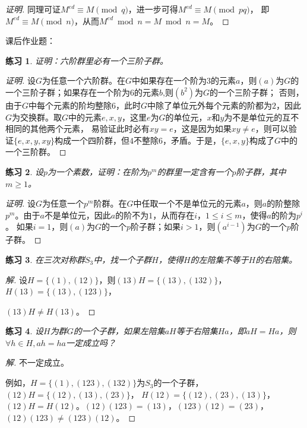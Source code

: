 \documentclass{article}
\newtheorem{Exercise}{练习}
\begin{document}
\begin{CJK*}{UTF8}{gbsn}
\begin{proof}[证明]
同理可证$M^{ed}\equiv M \pmod q$，进一步可得$M^{ed}\equiv M \pmod{pq}$，
即$M^{ed}\equiv M \pmod n$，从而$M^{ed} \bmod n = M\bmod n=M$。
\end{proof}

课后作业题：
\begin{Exercise}
证明：六阶群里必有一个三阶子群。
\end{Exercise}
\begin{proof}[证明]
  设$G$为任意一个六阶群。在$G$中如果存在一个阶为$3$的元素$a$，则$(a)$为$G$的一个三阶子群；如果存在一个阶为$6$的元素$b$,则$(b^2)$为$G$的一个三阶子群；
否则，由于$G$中每个元素的阶均整除$6$，此时$G$中除了单位元外每个元素的阶都为$2$，因此$G$为交换群。取$G$中的元素$e,x,y$，这里$e$为$G$的单位元，$x$和$y$为不是单位元的互不相同的其他两个元素，
易验证此时必有$xy=e$，这是因为如果$xy\neq e$，则可以验证$\{e,x,y,xy\}$构成一个四阶群，但$4$不整除$6$，矛盾。于是，$\{e,x,y\}$构成了$G$中的一个三阶群。
\end{proof}
\begin{Exercise}
设$p$为一个素数，证明：在阶为$p^m$的群里一定含有一个$p$阶子群，其中$m\geq 1$。
\end{Exercise}
\begin{proof}[证明]
  设$G$为任意一个$p^m$阶群。在$G$中任取一个不是单位元的元素$a$，则$a$的阶整除$p^m$。由于$a$不是单位元，因此$a$的阶不为$1$，从而存在$i$，$1\leq i\leq m$，使得$a$的阶为$p^i$。
  如果$i=1$，则$(a)$为$G$的一个$p$阶子群；如果$i>1$，则$(a^{i-1})$为$G$的一个$p$阶子群。
\end{proof}
\begin{Exercise}
在三次对称群$S_3$中，找一个子群$H$，使得$H$的左陪集不等于$H$的右陪集。
\end{Exercise}
\begin{proof}[解]
  设$H=\{(1),(12)\}$，则$(13)H=\{(13),(132)\}$，$H(13)=\{(13),(123)\}$， 
  
  $(13)H\neq H(13)$。
\end{proof}
\begin{Exercise}
设$H$为群$G$的一个子群，如果左陪集$aH$等于右陪集$Ha$，即$aH=Ha$，则$\forall h\in H, ah=ha$一定成立吗？
\end{Exercise}
\begin{proof}[解]
  不一定成立。

  例如，$H=\{(1),(123),(132)\}$为$S_3$的一个子群，$(12)H=\{(12),(13),(23)\}$，
  $H(12)=\{(12),(23),(13)\}$，$(12)H=H(12)$。$(12)(123)=(13)$，$(123)(12)=(23)$，$(12)(123)\neq (123)(12)$。
\end{proof}
\end{CJK*}
\end{document}

